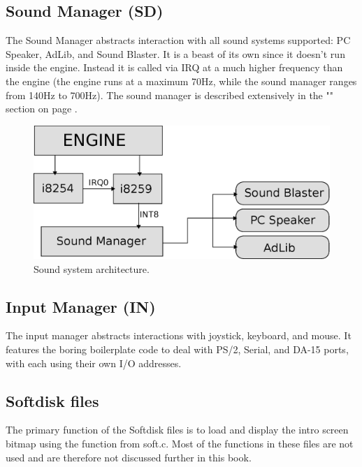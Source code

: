 \documentclass[book.tex]{subfiles}
\begin{document}
\subsection{Sound Manager (SD)}
The Sound Manager abstracts interaction with all sound systems supported: PC Speaker, AdLib, and Sound Blaster. It is a beast of its own since it doesn't run inside the engine. Instead it is called via IRQ at a much higher frequency than the engine (the engine runs at a maximum 70Hz, while the sound manager ranges from 140Hz to 700Hz). The sound manager is described extensively in the "" section on page \pageref{audio_and_heartbeat}. \\
 \par
\begin{figure}[H]
\centering
 \includegraphics[width=\textwidth]{imgs/drawings/sound_manager_architecture.eps}
 \caption{Sound system architecture.}
 \end{figure}
 \par


\subsection{Input Manager (IN)}
The input manager abstracts interactions with joystick, keyboard, and mouse. It features the boring boilerplate code to deal with PS/2, Serial, and DA-15 ports, with each using their own I/O addresses.

\subsection{Softdisk files}
The primary function of the Softdisk files is to load and display the intro screen bitmap using the  function from soft.c. Most of the functions in these files are not used and are therefore not discussed further in this book.
\pagebreak
\end{document}
